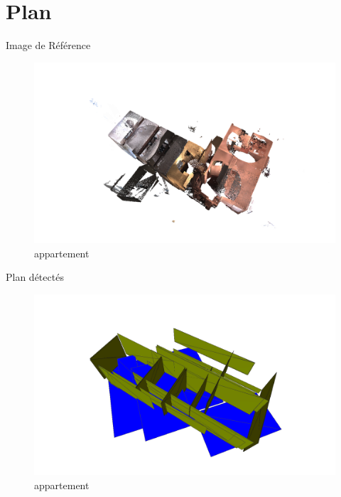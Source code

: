 \documentclass[11pt]{beamer}
\begin{document}
\section{Plan}



\begin{frame}{Image de Référence}
\begin{figure}[hbtp]
\centering
\includegraphics[width=\columnwidth]{appart01.png}
\caption{appartement}
\end{figure}
\end{frame}

\begin{frame}{Plan détectés}
\begin{figure}[hbtp]
\centering
\includegraphics[width=\columnwidth]{appart04.png}
\caption{appartement}
\end{figure}
\end{frame}
\end{document}
